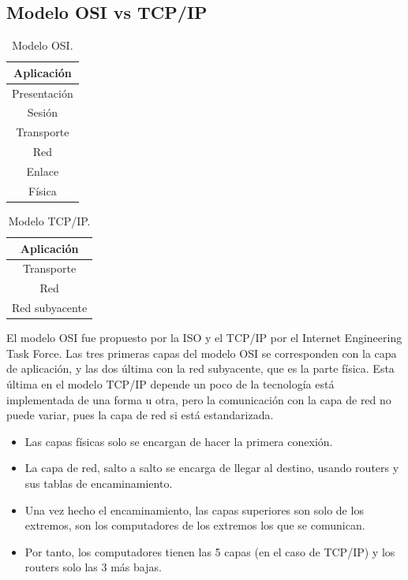 \subsection{Modelo OSI vs TCP/IP}
\begin{table}[H]
\centering
\begin{tabular}{|c|}
    \hline
    Aplicación \\\hline
    Presentación \\\hline
    Sesión \\ \hline
    Transporte \\ \hline
    Red \\\hline
    Enlace \\\hline
    Física \\\hline
\end{tabular}
\caption{Modelo OSI.}
\label{tab:mod_osi}
\end{table}

\begin{table}[H]
\centering
\begin{tabular}{|c|}
    \hline
    Aplicación \\\hline
    Transporte \\ \hline
    Red \\\hline
    Red subyacente \\\hline
\end{tabular}
\caption{Modelo TCP/IP.}
\label{tab:mod_tcp}
\end{table}

El modelo OSI fue propuesto por la ISO y el TCP/IP por el Internet Engineering Task Force. Las tres primeras capas del modelo OSI se corresponden con la capa de aplicación, y las dos última con la red subyacente, que es la parte física. Esta última en el modelo TCP/IP depende un poco de la tecnología está implementada de una forma u otra, pero la comunicación con la capa de red no puede variar, pues la capa de red si está estandarizada. 

\begin{itemize}
    
    \item Las capas físicas solo se encargan de hacer la primera conexión.
    \item La capa de red, salto a salto se encarga de llegar al destino, usando routers y sus tablas de encaminamiento. 
    \item Una vez hecho el encaminamiento, las capas superiores son solo de los extremos, son los computadores de los extremos los que se comunican. 
    \item Por tanto, los computadores tienen las 5 capas (en el caso de TCP/IP) y los routers solo las 3 más bajas. 
\end{itemize}


